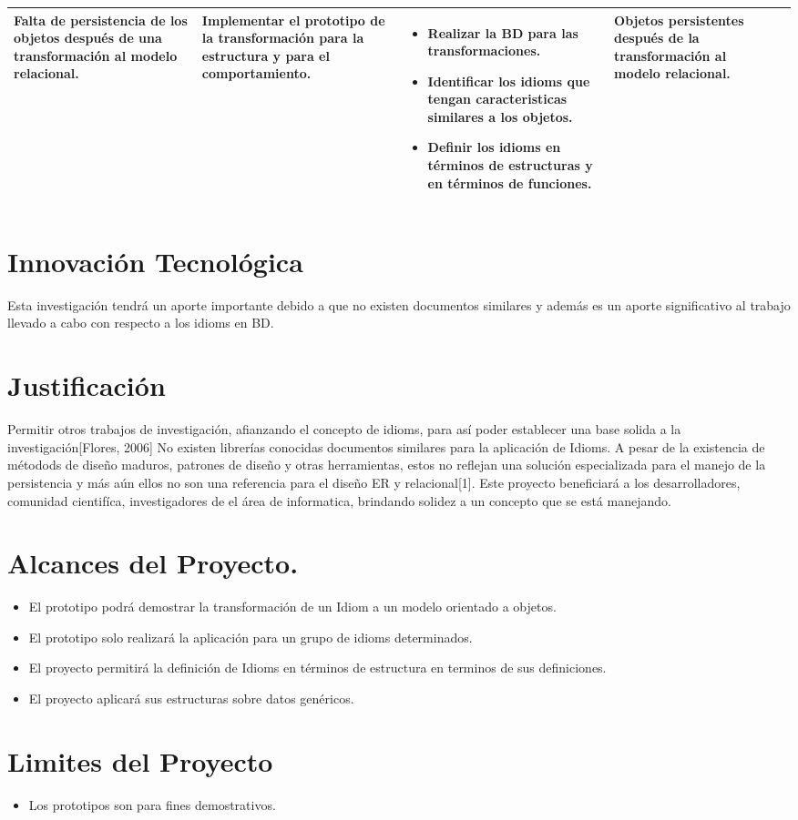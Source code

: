 \begin{longtable}{|p{2.8cm}| p{2.8cm}| p{2.8cm}| p{2.8cm}| p{2.8cm}|}
    {Falta de persistencia de los objetos después de una transformación al modelo relacional.} &
    Implementar el prototipo de la transformación para la estructura y para el comportamiento.
    &
    \parbox{2.8cm}{
    \begin{itemize}
        \item Realizar la BD para las transformaciones.
        \item Identificar los idioms que tengan caracteristicas similares a los objetos.
        \item Definir los idioms en términos de estructuras y en términos de funciones.
    \end{itemize}}
    &
    Objetos persistentes después de la transformación al modelo relacional.\\ \hline
\end{longtable}
\section {Innovación Tecnológica}
\noindent Esta investigación tendrá un aporte importante debido a que no existen documentos similares y además es un aporte
\noindent significativo al trabajo llevado a cabo con respecto a los idioms en BD.
\section {Justificación}
\noindent Permitir otros trabajos de investigación, afianzando el concepto de idioms, para así poder establecer una base
\noindent solida a la investigación[Flores, 2006]
\noindent No existen librerías conocidas documentos similares para la aplicación de Idioms.
\noindent A pesar de la existencia de métodods de diseño maduros, patrones de diseño y otras herramientas, estos no reflejan una solución especializada para el manejo de la persistencia y más aún ellos no son una referencia para el diseño ER y relacional[1].
\noindent Este proyecto beneficiará a los desarrolladores, comunidad cientifíca, investigadores de el área de informatica,
\noindent brindando solidez a un concepto que se está manejando.
\section {Alcances del Proyecto.}
\begin{itemize}
    \item El prototipo podrá demostrar la transformación de un Idiom a un modelo orientado a objetos.
    \item El prototipo solo realizará la aplicación para un grupo de idioms determinados.
    \item El proyecto permitirá la definición de Idioms en términos de estructura en terminos de sus definiciones.
    \item El proyecto aplicará sus estructuras sobre datos genéricos.
\end{itemize}
\section{Limites del Proyecto}
\begin{itemize}
    \item Los prototipos son para fines demostrativos.
\end{itemize}